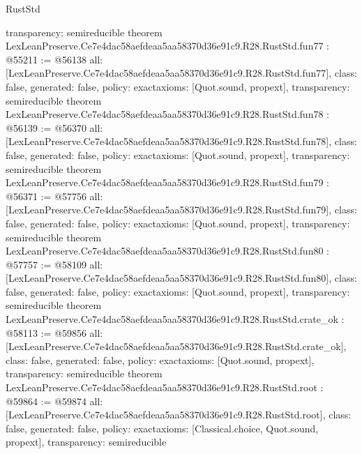 \begin{lexlean}{RustStd}
\begin{coremodule}
{  transparency: semireducible
}
theorem LexLeanPreserve.Ce7e4dac58aefdeaa5aa58370d36e91c9.R28.RustStd.fun77 : @55211 := @56138 {
  all: [LexLeanPreserve.Ce7e4dac58aefdeaa5aa58370d36e91c9.R28.RustStd.fun77],
  class: false,
  generated: false,
  policy: exact{axioms: [Quot.sound, propext]},
  transparency: semireducible
}
theorem LexLeanPreserve.Ce7e4dac58aefdeaa5aa58370d36e91c9.R28.RustStd.fun78 : @56139 := @56370 {
  all: [LexLeanPreserve.Ce7e4dac58aefdeaa5aa58370d36e91c9.R28.RustStd.fun78],
  class: false,
  generated: false,
  policy: exact{axioms: [Quot.sound, propext]},
  transparency: semireducible
}
theorem LexLeanPreserve.Ce7e4dac58aefdeaa5aa58370d36e91c9.R28.RustStd.fun79 : @56371 := @57756 {
  all: [LexLeanPreserve.Ce7e4dac58aefdeaa5aa58370d36e91c9.R28.RustStd.fun79],
  class: false,
  generated: false,
  policy: exact{axioms: [Quot.sound, propext]},
  transparency: semireducible
}
theorem LexLeanPreserve.Ce7e4dac58aefdeaa5aa58370d36e91c9.R28.RustStd.fun80 : @57757 := @58109 {
  all: [LexLeanPreserve.Ce7e4dac58aefdeaa5aa58370d36e91c9.R28.RustStd.fun80],
  class: false,
  generated: false,
  policy: exact{axioms: [Quot.sound, propext]},
  transparency: semireducible
}
theorem LexLeanPreserve.Ce7e4dac58aefdeaa5aa58370d36e91c9.R28.RustStd.crate_ok : @58113 := @59856 {
  all: [LexLeanPreserve.Ce7e4dac58aefdeaa5aa58370d36e91c9.R28.RustStd.crate_ok],
  class: false,
  generated: false,
  policy: exact{axioms: [Quot.sound, propext]},
  transparency: semireducible
}
theorem LexLeanPreserve.Ce7e4dac58aefdeaa5aa58370d36e91c9.R28.RustStd.root : @59864 := @59874 {
  all: [LexLeanPreserve.Ce7e4dac58aefdeaa5aa58370d36e91c9.R28.RustStd.root],
  class: false,
  generated: false,
  policy: exact{axioms: [Classical.choice, Quot.sound, propext]},
  transparency: semireducible
}


\end{coremodule}
\end{lexlean}
